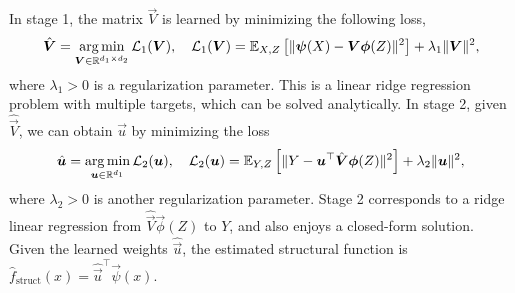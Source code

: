 In stage 1, the matrix $\vec{V}$ is learned by minimizing the following loss,
\begin{align}
    \hat{\vec{V}} = \argmin_{\vec{V} \in \mathbb{R}^{d_1 \times d_2}} \mathcal{L}_1(\vec{V}), \quad \mathcal{L}_1(\vec{V}) = \expect[X,Z]{\|\vec{\psi}(X) - \vec{V}\vec{\phi}(Z) \|^2} + \lambda_1 \|\vec{V}\|^2, \label{eq:stage1-loss}
\end{align}
where $\lambda_1>0$ is a regularization parameter. This is a  linear ridge regression problem with multiple targets, which can be solved analytically. In stage 2, given $\hat{\vec{V}}$, we can obtain $\vec{u}$ by minimizing the  loss 
\begin{align}
    \hat{\vec{u}} = \argmin_{\vec{u} \in \mathbb{R}^{d_1}} \mathcal{L}_2(\vec{u}), \quad \mathcal{L}_2(\vec{u}) = \expect[Y,Z]{\|Y - \vec{u}^\top \hat{\vec{V}} \vec{\phi}(Z) \|^2} + \lambda_2 \|\vec{u}\|^2, \label{eq:stage2-loss}
\end{align}
where $\lambda_2>0$ is another regularization parameter. Stage 2 corresponds to a ridge linear regression from $\hat{\vec{V}} \vec{\phi}(Z)$ to $Y$, and also enjoys a closed-form solution. Given the learned weights $\hat{\vec{u}}$, the estimated structural function is $\hat{f}_{\mathrm{struct}}(x) = \hat{\vec{u}}^\top \vec{\psi}(x)$.
